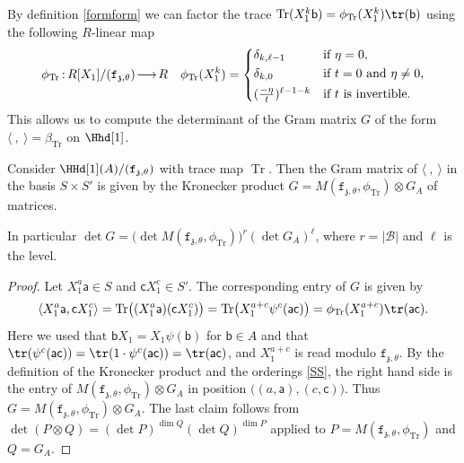 \documentclass[a4paper,11pt]{amsart}
\def\map#1#2{\,{:}\,#1\!\longrightarrow\!#2}
\let\<\langle
\let\>\rangle
\newcommand{\Tr}{\op{Tr}}
\newcommand\cB{\mathcal{B}}
\numberwithin{equation}{subsection}
\theoremstyle{definition}
\theoremstyle{theorem}
\theoremstyle{remark}
\newcommand\charge{{\mathfrak{z}}}
\newcommand\fct{\mathtt{f}_{\charge,\theta}}
\newcommand\ba{\mathsf{a}}
\newcommand\bb{\mathsf{b}}
\newcommand\bc{\mathsf{c}}
\newcommand\op{\operatorname}
\begin{document}
By definition \autoref{formform} we can  factor the trace $\Tr(X_1^{k}\bb)=\phi_{\Tr}(X_1^{k})\tr(\bb)$
using the following  $R$-linear map
   \begin{equation}\label{factor}
  \phi_{\Tr}\map{R[X_1]/(\fct)}R\quad {\phi_{\Tr}(X_1^{k})} =
     \begin{cases*}
        {\delta_{k, \ell-1}}& if $\eta=0$,\\
        {\delta_{k, 0}}& if $t=0$ and $\eta\not=0$,\\
             {(\frac{-\eta}{t})^{\ell-1-k}}& if $t$ is invertible.
    \end{cases*}
  \end{equation}
This allows us to compute the determinant of the  Gram matrix $G$ of the form $\<\ ,\ \>=\beta_{\Tr}$ on $\Hhd[1]$.

\begin{Lemma}\label{L:n1form}
Consider $\HHd[1](A)/(\fct)$ with trace map $\Tr$. Then the  Gram matrix of $\<\ ,\ \>$ in the basis $S\times S'$ is given by the Kronecker product  $G=M(\fct,\phi_{\Tr})\otimes G_A$ of matrices.

In particular $\det G=\bigl(\det M(\fct,\phi_{\Tr})\bigr)^{r}(\det G_A)^{\ell}$, where $r=|\cB|$ and $\ell$ is the level.
\end{Lemma}


\begin{proof}
Let  $X_1^{a}\ba\in S$ and $\bc X_1^{c}\in S'$. The corresponding entry of $G$ is given by
\begin{equation}\label{chickensoup}
  \<X_1^{a}\ba,\bc X_1^{c}\>=\Tr\bigl((X_1^{a}\ba)(\bc X_1^{c})\bigr)=\Tr\bigl(X_1^{a+c}\psi^{c}(\ba\bc)\bigr)
    =\phi_{\Tr}(X_1^{a+c})\tr(\ba\bc).
\end{equation}
Here we used that $\bb X_1=X_1\psi(\bb)$ for $\bb\in A$ and that
$\tr(\psi^c(\ba\bc))=\tr(1\cdot \psi^c(\ba\bc))=\tr(\ba\bc)$, and $X_1^{a+c}$ is read
modulo $\fct$. By the definition of the Kronecker product and the orderings \autoref{SS}, the
right hand side is the entry of $M(\fct,\phi_{\Tr})\otimes G_A$ in position
$\bigl((a,\ba),(c,\bc)\bigr)$. Thus $G=M(\fct,\phi_{\Tr})\otimes G_A$. The last claim follows
from $\det(P\otimes Q)=(\det P)^{\dim Q}(\det Q)^{\dim P}$ applied to $P=M(\fct,\phi_{\Tr})$ and
$Q=G_A$.
\end{proof}
\end{document}
